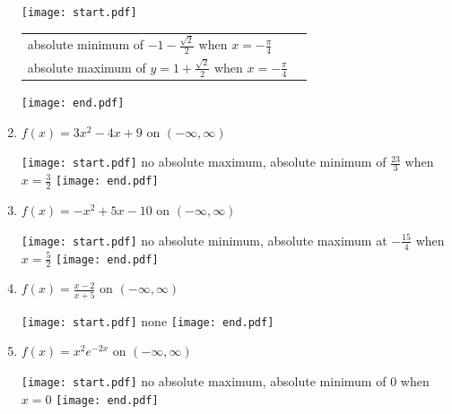 \documentclass[12pt]{article}
\begin{document}
\begin{enumerate}
\texttt{[image: start.pdf]}
{{\begin{tabular}{ll}
absolute minimum of $-1-\frac{\sqrt{2}}{2}$ when $x=-\frac{\pi}{4}$\\
absolute maximum of $y=1+\frac{\sqrt{2}}{2}$ when $x=-\frac{\pi}{4}$
\end{tabular}
}}
\texttt{[image: end.pdf]}


\item $f(x) = 3x^2-4x+9$ on $(-\infty, \infty)$ 

\texttt{[image: start.pdf]}
{{no absolute maximum, absolute minimum of $\frac{23}{3}$ when $x=\frac{3}{2}$}}
\texttt{[image: end.pdf]}


\item $f(x) = -x^2+5x-10$ on $(-\infty, \infty)$ 

\texttt{[image: start.pdf]}
{{no absolute minimum, absolute maximum at $-\frac{15}{4}$ when $x=\frac{5}{2}$}}
\texttt{[image: end.pdf]}


\item $f(x) = \frac{x-2}{x+5}$ on $(-\infty, \infty)$ 

\texttt{[image: start.pdf]}
{{none}}
\texttt{[image: end.pdf]}


\item $f(x) = x^2e^{-2x}$ on $(-\infty, \infty)$  

\texttt{[image: start.pdf]}
{{no absolute maximum, absolute minimum of 0 when $x=0$ }}
\texttt{[image: end.pdf]}


\end{enumerate}
\end{document}
